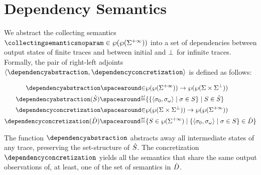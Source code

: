 \section{Dependency Semantics}

We abstract the collecting semantics $\collectingsemanticsnoparam\in\collectingtype$ into a set of dependencies between output states of finite traces and between initial and $\bot$ for infinite traces.
Formally, the pair of right-left adjoints $\tuple{\dependencyabstraction}{\dependencyconcretization}$ is defined as follows:
%
\begin{definition}
\begin{align*}
  \dependencyabstraction \IN& \collectingtype \to \dependencytype \\
  \dependencyabstraction(\defsetofsetoftraces) \DefeQ& \setdef{
    \setdef{\inputoutputtuple{\defseq}}{\defseq\in\defsetoftraces}
  }{
    \defsetoftraces\in\defsetofsetoftraces
  }\\
  \dependencyconcretization \IN& \dependencytype \to \collectingtype \\
  \dependencyconcretization(\defsetofsetofdependencies) \DefeQ& \setdef{
    \defsetoftraces\in\setof\finiteinfinitesequences
  }{
    \setdef{\inputoutputtuple\defseq}{\defseq\in\defsetoftraces} \in \defsetofsetofdependencies
  }
\end{align*}
\end{definition}
The function $\dependencyabstraction$ abstracts away all intermediate states of any trace, preserving the set-structure of $\dot{S}$.
The concretization $\dependencyconcretization$ yields all the semantics that share the same output observations of, at least, one of the set of semantics in $\dot{D}$.


